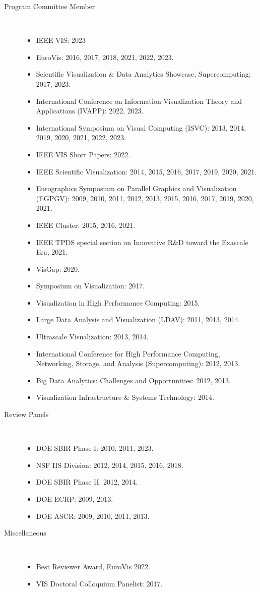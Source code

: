 \documentclass{article}
\begin{document}
\begin{description}
\begin{itemize}
  \end{itemize}
\item[Program Committee Member]~
  \begin{itemize}
  \item IEEE VIS: 2023
  \item
    EuroVis: 2016, 2017, 2018, 2021, 2022, 2023.
  \item
    Scientific Visualization \& Data Analytics Showcase, Supercomputing: 2017, 2023.
  \item
    International Conference on Information Visualization Theory and Applications (IVAPP): 2022, 2023. 
  \item
    International Symposium on Visual Computing (ISVC): 2013, 2014, 2019, 2020, 2021, 2022, 2023.
  \item
    IEEE VIS Short Papers: 2022.
  \item
    IEEE Scientific Visualization: 2014, 2015, 2016, 2017, 2019, 2020, 2021.
  \item
    Eurographics Symposium on Parallel Graphics and Visualization (EGPGV): 2009, 2010, 2011, 2012, 2013, 2015, 2016, 2017, 2019, 2020, 2021.
  \item
    IEEE Cluster: 2015, 2016, 2021.
  \item
    IEEE TPDS special section on Innovative R\&D toward the Exascale Era, 2021.
  \item
    VisGap: 2020.
  \item
    Symposium on Visualization: 2017.
  \item
    Visualization in High Performance Computing: 2015.
  \item
    Large Data Analysis and Visualization (LDAV): 2011, 2013, 2014.
  \item
    Ultrascale Visualization: 2013, 2014.
  \item
    International Conference for High Performance Computing, Networking, Storage, and Analysis (Supercomputing): 2012, 2013.
  \item
    Big Data Analytics: Challenges and Opportunities: 2012, 2013.
  \item
    Visualization Infrastructure \& Systems Technology: 2014.
  \end{itemize}
\item[Review Panels]~
  \begin{itemize}
  \item
    DOE SBIR Phase I: 2010, 2011, 2023.
  \item
    NSF IIS Division: 2012, 2014, 2015, 2016, 2018.
  \item
    DOE SBIR Phase II: 2012, 2014.
  \item
    DOE ECRP: 2009, 2013.
  \item
    DOE ASCR: 2009, 2010, 2011, 2013.
  \end{itemize}
\item[Miscellaneous]~
  \begin{itemize}
  \item
    Best Reviewer Award, EuroVis 2022.
  \item
    VIS Doctoral Colloquium Panelist: 2017.
  \end{itemize}
\end{description}
\end{document}
